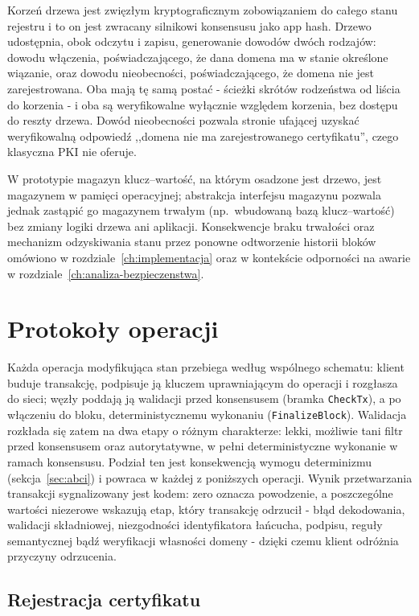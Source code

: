 Korzeń drzewa jest zwięzłym kryptograficznym zobowiązaniem do całego stanu rejestru i to on jest zwracany silnikowi konsensusu jako app hash. Drzewo udostępnia, obok odczytu i zapisu, generowanie dowodów dwóch rodzajów: dowodu włączenia, poświadczającego, że dana domena ma w stanie określone wiązanie, oraz dowodu nieobecności, poświadczającego, że domena nie jest zarejestrowana. Oba mają tę samą postać - ścieżki skrótów rodzeństwa od liścia do korzenia - i oba są weryfikowalne wyłącznie względem korzenia, bez dostępu do reszty drzewa. Dowód nieobecności pozwala stronie ufającej uzyskać weryfikowalną odpowiedź ,,domena nie ma zarejestrowanego certyfikatu'', czego klasyczna PKI nie oferuje.

W prototypie magazyn klucz--wartość, na którym osadzone jest drzewo, jest magazynem w pamięci operacyjnej; abstrakcja interfejsu magazynu pozwala jednak zastąpić go magazynem trwałym (np.\ wbudowaną bazą klucz--wartość) bez zmiany logiki drzewa ani aplikacji. Konsekwencje braku trwałości oraz mechanizm odzyskiwania stanu przez ponowne odtworzenie historii bloków omówiono w rozdziale~\ref{ch:implementacja} oraz w kontekście odporności na awarie w rozdziale~\ref{ch:analiza-bezpieczenstwa}.

\section{Protokoły operacji}
\label{sec:protokoly}

Każda operacja modyfikująca stan przebiega według wspólnego schematu: klient buduje transakcję, podpisuje ją kluczem uprawniającym do operacji i rozgłasza do sieci; węzły poddają ją walidacji przed konsensusem (bramka \texttt{CheckTx}), a po włączeniu do bloku, deterministycznemu wykonaniu (\texttt{FinalizeBlock}). Walidacja rozkłada się zatem na dwa etapy o różnym charakterze: lekki, możliwie tani filtr przed konsensusem oraz autorytatywne, w pełni deterministyczne wykonanie w ramach konsensusu. Podział ten jest konsekwencją wymogu determinizmu (sekcja~\ref{sec:abci}) i powraca w każdej z poniższych operacji. Wynik przetwarzania transakcji sygnalizowany jest kodem: zero oznacza powodzenie, a poszczególne wartości niezerowe wskazują etap, który transakcję odrzucił - błąd dekodowania, walidacji składniowej, niezgodności identyfikatora łańcucha, podpisu, reguły semantycznej bądź weryfikacji własności domeny - dzięki czemu klient odróżnia przyczyny odrzucenia.

\subsection{Rejestracja certyfikatu}
\label{subsec:rejestracja}

